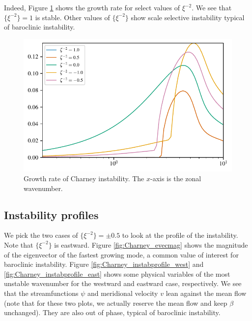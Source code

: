 Indeed, Figure \ref{fig:Charney_evalparam} shows the growth rate for select values of $\xi^{-2}$. We see that $\{\xi^{-2}\}=1$ is stable. Other values of $\{\xi^{-2}\}$ show scale selective instability typical of baroclinic instability.

\begin{figure}
    \centering
    \includegraphics{Charney_evalparam}
    \caption{Growth rate of Charney instability. The $x$-axis is the zonal wavenumber.}
    \label{fig:Charney_evalparam}
\end{figure}

\subsection{Instability profiles}
We pick the two cases of $\{\xi^{-2}\}=\pm0.5$ to look at the profile of the instability. Note that $\{\xi^{-2}\}$ is eastward. Figure \ref{fig:Charney_evecmag} shows the magnitude of the eigenvector of the fastest growing mode, a common value of interest for baroclinic instability. Figure \ref{fig:Charney_instabprofile_west} and \ref{fig:Charney_instabprofile_east} shows some physical variables of the most unstable wavenumber for the westward and eastward case, respectively. We see that the streamfunctions $\psi$ and meridional velocity $v$ lean against the mean flow (note that for these two plots, we actually reserve the mean flow and keep $\beta$ unchanged). They are also out of phase, typical of baroclinic instability.

